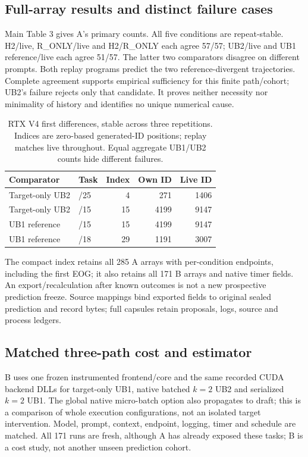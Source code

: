 \subsection{Full-array results and distinct failure cases}
Main Table 3 gives A's primary counts. All five conditions are repeat-stable. H2/live, R\_ONLY/live and H2/R\_ONLY each agree 57/57; UB2/live and UB1 reference/live each agree 51/57. The latter two comparators disagree on different prompts. Both replay programs predict the two reference-divergent trajectories. Complete agreement supports empirical sufficiency for this finite path/cohort; UB2's failure rejects only that candidate. It proves neither necessity nor minimality of history and identifies no unique numerical cause.

\begin{table}[t]
\caption{RTX V4 first differences, stable across three repetitions. Indices are zero-based generated-ID positions; replay matches live throughout. Equal aggregate UB1/UB2 counts hide different failures.}
\label{tab:rtxv4divergences}
\centering
\begin{tabular}{@{}llrrr@{}}
\toprule
Comparator & Task & Index & Own ID & Live ID \\
\midrule
Target-only UB2 & /25 & 4 & 271 & 1406 \\
Target-only UB2 & /15 & 15 & 4199 & 9147 \\
UB1 reference & /15 & 15 & 4199 & 9147 \\
UB1 reference & /18 & 29 & 1191 & 3007 \\
\bottomrule
\end{tabular}
\end{table}

The compact index retains all 285 A arrays with per-condition endpoints, including the first EOG; it also retains all 171 B arrays and native timer fields. An export/recalculation after known outcomes is not a new prospective prediction freeze. Source mappings bind exported fields to original sealed prediction and record bytes; full capsules retain proposals, logs, source and process ledgers.

\subsection{Matched three-path cost and estimator}
B uses one frozen instrumented frontend/core and the same recorded CUDA backend DLLs for target-only UB1, native batched $k=2$ UB2 and serialized $k=2$ UB1. The global native micro-batch option also propagates to draft; this is a comparison of whole execution configurations, not an isolated target intervention. Model, prompt, context, endpoint, logging, timer and schedule are matched. All 171 runs are fresh, although A has already exposed these tasks; B is a cost study, not another unseen prediction cohort.

